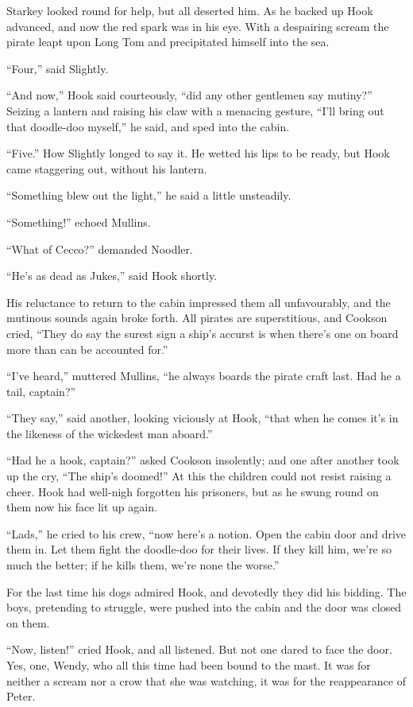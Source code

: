 Starkey looked round for help, but all deserted him. As he backed up
Hook advanced, and now the red spark was in his eye. With a despairing
scream the pirate leapt upon Long Tom and precipitated himself into the
sea.

``Four,'' said Slightly.

``And now,'' Hook said courteously, ``did any other gentlemen say mutiny?''
Seizing a lantern and raising his claw with a menacing gesture, ``I'll
bring out that doodle-doo myself,'' he said, and sped into the cabin.

``Five.'' How Slightly longed to say it. He wetted his lips to be ready,
but Hook came staggering out, without his lantern.

``Something blew out the light,'' he said a little unsteadily.

``Something!'' echoed Mullins.

``What of Cecco?'' demanded Noodler.

``He's as dead as Jukes,'' said Hook shortly.

His reluctance to return to the cabin impressed them all unfavourably,
and the mutinous sounds again broke forth. All pirates are
superstitious, and Cookson cried, ``They do say the surest sign a ship's
accurst is when there's one on board more than can be accounted for.''

``I've heard,'' muttered Mullins, ``he always boards the pirate craft
last. Had he a tail, captain?''

``They say,'' said another, looking viciously at Hook, ``that when he
comes it's in the likeness of the wickedest man aboard.''

``Had he a hook, captain?'' asked Cookson insolently; and one after
another took up the cry, ``The ship's doomed!'' At this the children
could not resist raising a cheer. Hook had well-nigh forgotten his
prisoners, but as he swung round on them now his face lit up again.

``Lads,'' he cried to his crew, ``now here's a notion. Open the cabin door
and drive them in. Let them fight the doodle-doo for their lives. If
they kill him, we're so much the better; if he kills them, we're none
the worse.''

For the last time his dogs admired Hook, and devotedly they did his
bidding. The boys, pretending to struggle, were pushed into the cabin
and the door was closed on them.

``Now, listen!'' cried Hook, and all listened. But not one dared to face
the door. Yes, one, Wendy, who all this time had been bound to the
mast. It was for neither a scream nor a crow that she was watching, it
was for the reappearance of Peter.

